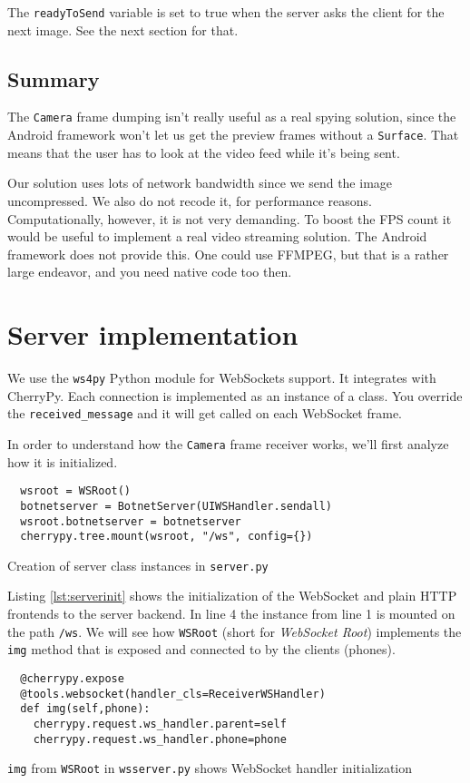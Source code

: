 \documentclass[a4paper]{report}
\newcommand{\classname}[1]{\texttt{#1}}
\newcommand{\methodname}[1]{\texttt{#1}}
\newcommand{\variable}[1]{\texttt{#1}}
\newcommand{\filename}[1]{\texttt{#1}}
\newcommand{\modulename}[1]{\texttt{#1}}
\begin{document}
The \variable{readyToSend} variable is set to true when the server asks the client for the next image. See the next section for that.
\subsection{Summary}
The \classname{Camera} frame dumping isn't really useful as a real spying solution, since the Android framework won't let us get the preview frames without a \classname{Surface}. That means that the user has to look at the video feed while it's being sent.

Our solution uses lots of network bandwidth since we send the image uncompressed. We also do not recode it, for performance reasons. Computationally, however, it is not very demanding. To boost the FPS count it would be useful to implement a real video streaming solution. The Android framework does not provide this. One could use FFMPEG, but that is a rather large endeavor, and you need native code too then.
\section{Server implementation}
We use the \modulename{ws4py} Python module for WebSockets support. It integrates with CherryPy. Each connection is implemented as an instance of a class. You override the \methodname{received\_message} and it will get called on each WebSocket frame.

In order to understand how the \classname{Camera} frame receiver works, we'll first analyze how it is initialized.
\begin{listing}[H]
\begin{verbatim}
  wsroot = WSRoot()
  botnetserver = BotnetServer(UIWSHandler.sendall)
  wsroot.botnetserver = botnetserver
  cherrypy.tree.mount(wsroot, "/ws", config={})
\end{verbatim}
\caption{Creation of server class instances in \filename{server.py}}
\label{lst:serverinit}
\end{listing}
Listing \ref{lst:serverinit} shows the initialization of the WebSocket and plain HTTP frontends to the server backend. In line 4 the instance from line 1 is mounted on the path \filename{/ws}. We will see how \classname{WSRoot} (short for \textit{WebSocket Root}) implements the \methodname{img} method that is exposed and connected to by the clients (phones).

\begin{listing}[H]
\begin{verbatim}
  @cherrypy.expose
  @tools.websocket(handler_cls=ReceiverWSHandler)
  def img(self,phone):
    cherrypy.request.ws_handler.parent=self
    cherrypy.request.ws_handler.phone=phone
\end{verbatim}
\caption{\methodname{img} from \classname{WSRoot} in \filename{wsserver.py} shows WebSocket handler initialization}
\label{lst:handlerinit}
\end{listing}
\end{document}
